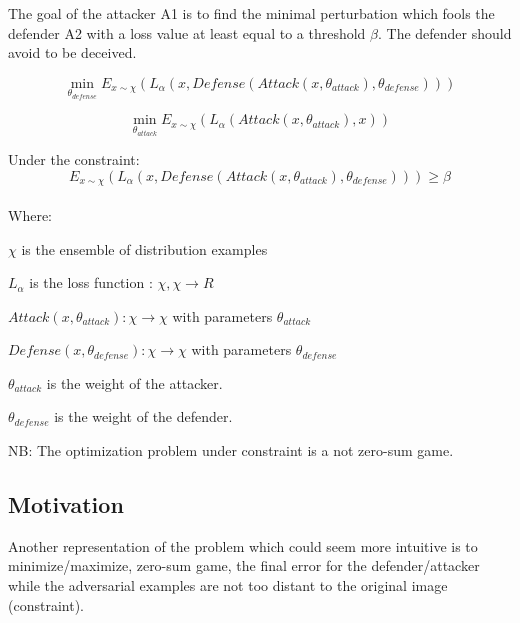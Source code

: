 \documentclass[12pt]{article}
\begin{document}
\begin{center}
\end{center}

The goal of the attacker A1 is to find the minimal perturbation which fools the defender A2 with a loss value at least equal to a threshold $\beta$. The defender should avoid to be deceived.

\begin{equation}\label{eq:defense}
\min_{\theta_{defense}} E_{x \sim \chi}(L_{\alpha}(x, Defense(Attack(x,\theta_{attack} ),\theta_{defense})))
\end{equation}

\begin{equation}\label{eq:attack}
\min_{\theta_{attack}} E_{x \sim \chi}(L_{\alpha}(Attack(x, \theta_{attack}), x))
\end{equation}

Under the constraint:
\begin{equation}\label{eq:constraint}
E_{x \sim \chi}(L_{\alpha}(x, Defense(Attack(x, \theta_{attack}), \theta_{defense}))) \geq \beta
\end{equation}

\paragraph{}
Where:

\setlength{\parindent}{15ex}
$\chi$ is the ensemble of distribution examples

$L_{\alpha}$ is the loss function : $\chi, \chi \to R$

$Attack(x, \theta_{attack}): \chi \to \chi$ with parameters $\theta_{attack}$

$Defense(x, \theta_{defense}): \chi \to \chi$ with parameters $\theta_{defense}$

$\theta_{attack}$ is the weight of the attacker.

$\theta_{defense}$ is the weight of the defender.

\setlength{\parindent}{0ex}
NB: The optimization problem under constraint is a not zero-sum game.
\\
\subsection{Motivation}
Another representation of the problem which could seem more intuitive is to minimize/maximize, zero-sum game, the final error for the defender/attacker while the adversarial examples are not too distant to the original image (constraint).
\end{document}
